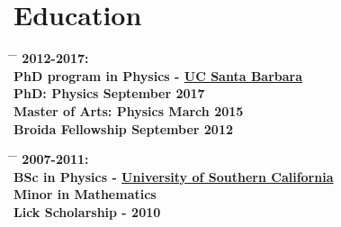\documentclass[10pt]{article} %
\begin{document}
\section{Education}
\parbox{0.5\textwidth}{ %
\begin{tabbing}
\hspace{3cm} \= \hspace{4cm} \= \kill
\bf{2012-2017:} \\
PhD program in Physics - \href{http://www.ucsb.edu}{UC Santa Barbara}\\[5pt]
\sqbullet\hspace{3mm}PhD: Physics \> \hspace{25mm}September 2017 \\
\sqbullet\hspace{3mm}Master of Arts: Physics \> \hspace{25mm}March \hspace{6mm} 2015 \\
\sqbullet\hspace{3mm}Broida Fellowship \> \hspace{25mm}September 2012
\end{tabbing}}
\hfill %
\parbox{0.5\textwidth}{ %
\begin{tabbing}
\hspace{3cm} \= \hspace{4cm} \= \kill
\bf{2007-2011:} \\
BSc in Physics - \href{http://www.usc.edu}{University of Southern California} \\[5pt]
\sqbullet\hspace{3mm}Minor in Mathematics\\
\sqbullet\hspace{3mm}Lick Scholarship - 2010
\end{tabbing}}

\end{document}
